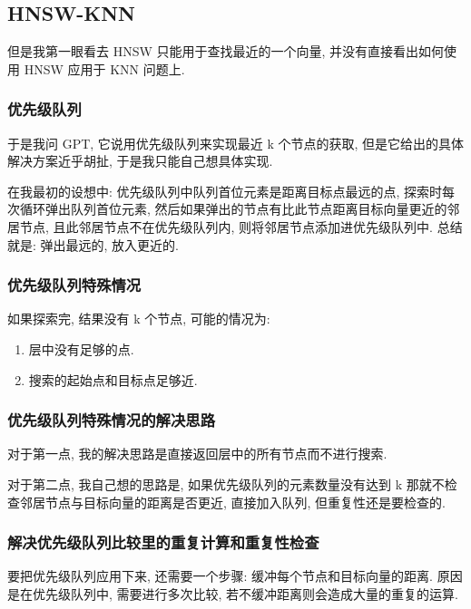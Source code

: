 \subsection{HNSW-KNN}

但是我第一眼看去 HNSW 只能用于查找最近的一个向量, 并没有直接看出如何使用 HNSW 应用于 KNN 问题上.

\subsubsection{优先级队列}

于是我问 GPT, 它说用优先级队列来实现最近 k 个节点的获取, 但是它给出的具体解决方案近乎胡扯,
于是我只能自己想具体实现.

在我最初的设想中: 优先级队列中队列首位元素是距离目标点最远的点, 探索时每次循环弹出队列首位元素,
然后如果弹出的节点有比此节点距离目标向量更近的邻居节点, 且此邻居节点不在优先级队列内,
则将邻居节点添加进优先级队列中.
总结就是: 弹出最远的, 放入更近的.

\subsubsection{优先级队列特殊情况}

如果探索完, 结果没有 k 个节点, 可能的情况为:

\begin{enumerate}
    \item 层中没有足够的点.
    \item 搜索的起始点和目标点足够近.
\end{enumerate}

\subsubsection{优先级队列特殊情况的解决思路}

对于第一点, 我的解决思路是直接返回层中的所有节点而不进行搜索.

对于第二点, 我自己想的思路是, 如果优先级队列的元素数量没有达到 k 那就不检查邻居节点与目标向量的距离是否更近,
直接加入队列, 但重复性还是要检查的.\label{repetitive-inspection}

\subsubsection{解决优先级队列比较里的重复计算和重复性检查}

要把优先级队列应用下来, 还需要一个步骤: 缓冲每个节点和目标向量的距离.
原因是在优先级队列中, 需要进行多次比较, 若不缓冲距离则会造成大量的重复的运算.

